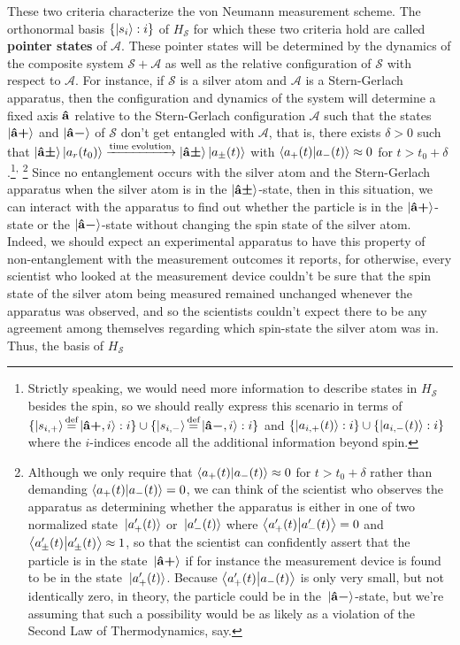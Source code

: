     These two criteria characterize the von Neumann measurement scheme. The orthonormal basis $\{\ket{s_i}:i\}$ of $H_\mathcal{S}$ for which these two criteria hold are called \textbf{pointer states\label{pointer}} of $\mathcal{A}$. These pointer states will be determined by the  dynamics of the composite system $\mathcal{S}+\mathcal{A}$ as well as the relative configuration of $\mathcal{S}$ with respect to $\mathcal{A}$. For instance, if $\mathcal{S}$ is a silver atom and $\mathcal{A}$ is a Stern-Gerlach apparatus, then the configuration and dynamics of the system will determine a fixed axis $\vb{\hat{{a}}}$ relative to the Stern-Gerlach configuration $\mathcal{A}$ such that the states $\ket{\vb{\hat{{a}}}\bm{+}}$ and $\ket{\vb{\hat{{a}}}\bm{-}}$ of $\mathcal{S}$ don't get entangled with $\mathcal{A}$, that is, there exists $\delta>0$ such that $\ket{\vb{\hat{{a}}}\bm{\pm}}\ket{a_r(t_0)}\xrightarrow{\text{time evolution}}\ket{\vb{\hat{{a}}}\bm{\pm}}\ket{a_\pm(t)}$ with $\ip{a_+(t)}{a_-(t)}\approx 0$ for $t> t_0+\delta$.\footnote{%
    Strictly speaking, we would  need more information to describe states in $H_\mathcal{S}$ besides the spin, so we should really express this scenario in terms of $\{\ket{s_{i,+}}\myeq \ket{\uvbp{a},i}:i\}\cup \{\ket{s_{i,-}}\myeq \ket{\uvbm{a},i}:i\}$ and  $\{\ket{a_{i,+}(t)}:i\}\cup\{\ket{a_{i,-}(t)}:i\}$ where the $i$-indices encode all the additional information beyond spin.
    }\textsuperscript{, }\footnote{\label{nearzero}Although 
    we only require that  $\ip{a_+(t)}{a_-(t)}\approx 0$ for $t> t_0+\delta$ rather than demanding $\ip{a_+(t)}{a_-(t)} = 0$, we can think of the scientist who observes the apparatus as determining whether the apparatus is either in one of two normalized state $\ket*{a_+'(t)}$ or $\ket*{a_-'(t)}$ where 
    $\ip{a_+'(t)}{a_-'(t)} = 0$ 
    and $\ip{a_\pm'(t)}{a_\pm'(t)}\approx 1$, so that the scientist can confidently assert that the particle is in the state $\ket*{\vb{\hat{{a}}}\bm{+}}$ if for instance the measurement device is found to be in the state $\ket*{a_+'(t)}$. Because $\ip{a_+'(t)}{a_-(t)}$ is only very small, but not identically zero, in theory, the particle could be in the $\ket*{\vb{\hat{{a}}}\bm{-}}$-state, but we're assuming that such a possibility would be as likely as a violation of the Second Law of Thermodynamics, say.}
    Since no entanglement occurs with the silver atom and the Stern-Gerlach apparatus when the silver atom is in the $\ket{\vb{\hat{{a}}}\bm{\pm}}$-state, then in this situation, we can interact with the apparatus to find out whether the particle is in the $\ket{\vb{\hat{{a}}}\bm{+}}$-state or the $\ket{\vb{\hat{{a}}}\bm{-}}$-state without changing the spin state of the silver atom. Indeed, we should expect an experimental apparatus to have this property of non-entanglement with the measurement outcomes it reports, for otherwise, every scientist who looked at the measurement device couldn't be sure that the spin state of the silver atom being measured remained unchanged whenever the apparatus was observed, and so the scientists couldn't expect there to be any agreement among themselves  regarding which spin-state the silver atom was in. Thus, the basis of $H_\mathcal{S}$ 
